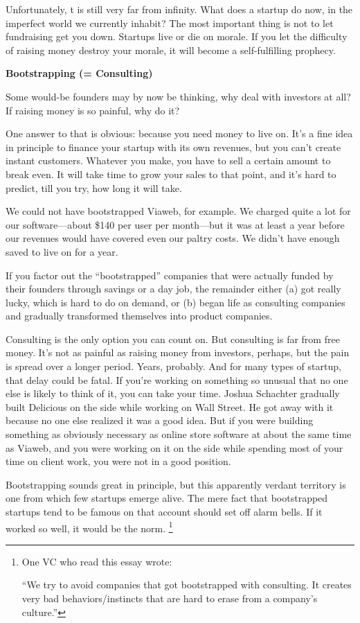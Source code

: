\documentclass[12pt]{book}
\begin{document}
Unfortunately, t is still very far from infinity. What does a startup do
now, in the imperfect world we currently inhabit? The most important
thing is not to let fundraising get you down. Startups live or die on
morale. If you let the difficulty of raising money destroy your morale,
it will become a self-fulfilling prophecy.

\textbf{Bootstrapping (= Consulting)}

Some would-be founders may by now be thinking, why deal with investors
at all? If raising money is so painful, why do it?

One answer to that is obvious: because you need money to live on. It's a
fine idea in principle to finance your startup with its own revenues,
but you can't create instant customers. Whatever you make, you have to
sell a certain amount to break even. It will take time to grow your
sales to that point, and it's hard to predict, till you try, how long it
will take.

We could not have bootstrapped Viaweb, for example. We charged quite a
lot for our software---about \$140 per user per month---but it was at
least a year before our revenues would have covered even our paltry
costs. We didn't have enough saved to live on for a year.

If you factor out the ``bootstrapped'' companies that were actually
funded by their founders through savings or a day job, the remainder
either (a) got really lucky, which is hard to do on demand, or (b) began
life as consulting companies and gradually transformed themselves into
product companies.

Consulting is the only option you can count on. But consulting is far
from free money. It's not as painful as raising money from investors,
perhaps, but the pain is spread over a longer period. Years, probably.
And for many types of startup, that delay could be fatal. If you're
working on something so unusual that no one else is likely to think of
it, you can take your time. Joshua Schachter gradually built Delicious
on the side while working on Wall Street. He got away with it because no
one else realized it was a good idea. But if you were building something
as obviously necessary as online store software at about the same time
as Viaweb, and you were working on it on the side while spending most of
your time on client work, you were not in a good position.

Bootstrapping sounds great in principle, but this apparently verdant
territory is one from which few startups emerge alive. The mere fact
that bootstrapped startups tend to be famous on that account should set
off alarm bells. If it worked so well, it would be the norm.
\footnote{One VC who read this essay wrote:

``We try to avoid companies that got bootstrapped with consulting. It
creates very bad behaviors/instincts that are hard to erase from a
company's culture.''}
\end{document}
